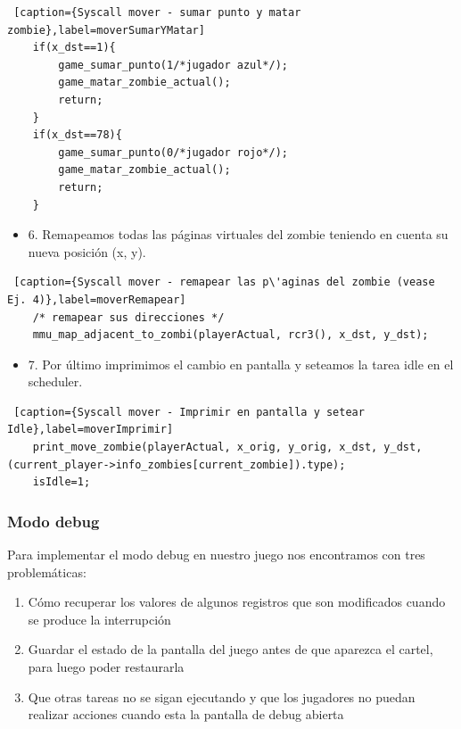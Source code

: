 \begin{lstlisting} [caption={Syscall mover - sumar punto y matar zombie},label=moverSumarYMatar]
    if(x_dst==1){
        game_sumar_punto(1/*jugador azul*/);
        game_matar_zombie_actual();
        return;
    }
    if(x_dst==78){
        game_sumar_punto(0/*jugador rojo*/);
        game_matar_zombie_actual();
        return;
    }
\end{lstlisting}

\begin{itemize}
\item 6. Remapeamos todas las p\'aginas virtuales del zombie teniendo en cuenta su nueva posici\'on (x, y).
\end{itemize}

\begin{lstlisting} [caption={Syscall mover - remapear las p\'aginas del zombie (vease Ej. 4)},label=moverRemapear]
    /* remapear sus direcciones */
    mmu_map_adjacent_to_zombi(playerActual, rcr3(), x_dst, y_dst);
\end{lstlisting}

\begin{itemize}
\item 7. Por \'ultimo imprimimos el cambio en pantalla y seteamos la tarea idle en el scheduler.
\end{itemize}

\begin{lstlisting} [caption={Syscall mover - Imprimir en pantalla y setear Idle},label=moverImprimir]
    print_move_zombie(playerActual, x_orig, y_orig, x_dst, y_dst, (current_player->info_zombies[current_zombie]).type);
    isIdle=1;
\end{lstlisting}

\subsubsection*{Modo debug}
\par{Para implementar el modo debug en nuestro juego nos encontramos con tres problem\'aticas:}
\begin{enumerate}
\item C\'omo recuperar los valores de algunos registros que son modificados cuando se produce la interrupci\'on
\item Guardar el estado de la pantalla del juego antes de que aparezca el cartel, para luego poder restaurarla
\item Que otras tareas no se sigan ejecutando y que los jugadores no puedan realizar acciones cuando esta la pantalla de debug abierta
\end{enumerate}


